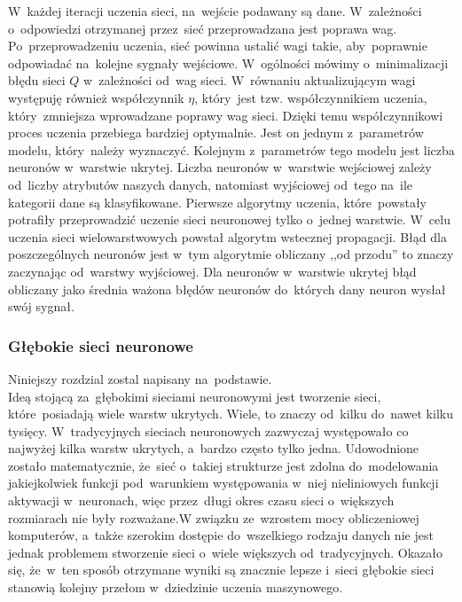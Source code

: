 
W~każdej iteracji uczenia sieci, na~wejście podawany są dane. W~zależności o~odpowiedzi otrzymanej przez~sieć przeprowadzana jest poprawa wag. Po~przeprowadzeniu uczenia, sieć powinna ustalić wagi takie, aby~poprawnie odpowiadać na~kolejne sygnały wejściowe. W~ogólności mówimy o~minimalizacji błędu sieci $Q$ w~zależności od~wag sieci. W~równaniu aktualizującym wagi występuję również współczynnik $\eta$, który~jest tzw. współczynnikiem uczenia, który~zmniejsza wprowadzane poprawy wag sieci. Dzięki temu współczynnikowi proces uczenia przebiega bardziej optymalnie. Jest on jednym z~parametrów modelu, który~należy wyznaczyć. Kolejnym z~parametrów tego modelu jest liczba neuronów w~warstwie ukrytej. Liczba neuronów w~warstwie wejściowej zależy od~liczby atrybutów naszych danych, natomiast wyjściowej od~tego na~ile kategorii dane są klasyfikowane. Pierwsze algorytmy uczenia, które~powstały potrafiły przeprowadzić uczenie sieci neuronowej tylko o~jednej warstwie. W~celu uczenia sieci wielowarstwowych powstał algorytm wstecznej propagacji. Błąd dla poszczególnych neuronów jest w~tym algorytmie obliczany ,,od przodu'' to znaczy zaczynając od~warstwy wyjściowej. Dla neuronów w~warstwie ukrytej błąd obliczany jako średnia ważona błędów neuronów do~których dany neuron wysłał swój sygnał.
\subsubsection{Głębokie sieci neuronowe}\label{dnn}
Niniejszy rozdzial zostal napisany na~podstawie\cite{dnn1}.\\
Ideą stojącą za~głębokimi sieciami neuronowymi jest tworzenie sieci, które~posiadają wiele warstw ukrytych. Wiele, to znaczy od~kilku do~nawet kilku tysięcy. W~tradycyjnych sieciach neuronowych zazwyczaj występowało co najwyżej kilka warstw ukrytych, a~bardzo często tylko jedna. Udowodnione zostało matematycznie, że~sieć o~takiej strukturze jest zdolna do~modelowania jakiejkolwiek funkcji pod~warunkiem występowania w~niej nieliniowych funkcji aktywacji w~neuronach, więc przez~długi okres czasu sieci o~większych rozmiarach nie były rozważane.W związku ze~wzrostem mocy obliczeniowej komputerów, a~także szerokim dostępie do~wszelkiego rodzaju danych nie jest jednak problemem stworzenie sieci o~wiele większych od~tradycyjnych. Okazało się, że~w~ten sposób otrzymane wyniki są znacznie lepsze i~sieci głębokie sieci stanowią kolejny przełom w~dziedzinie uczenia maszynowego.

